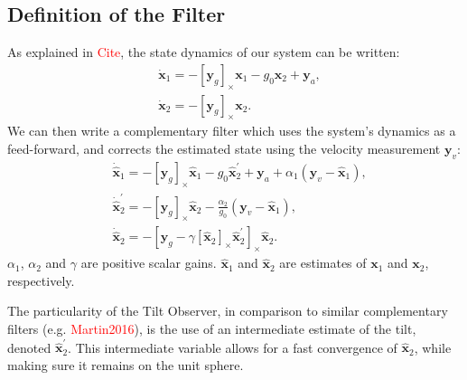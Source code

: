\documentclass{IJCAS}
\begin{document}
\subsection{Definition of the Filter}
As explained in \textcolor{red}{Cite}, the state dynamics of our system can be written:
\begin{align} 
&\dot{\boldsymbol{x}}_{1} = -\left[\boldsymbol{y}_{g}\right]_{\times} \boldsymbol{x}_{1} - g_{0}\boldsymbol{x}_{2} + \boldsymbol{y}_{a} , \label{eq:x1_dot} \\
&\dot{\boldsymbol{x}}_{2} = -\left[\boldsymbol{y}_{g}\right]_{\times} \boldsymbol{x}_{2}. \label{eq:x2_dot}
\end{align} 
We can then write a complementary filter which uses the system's dynamics as a feed-forward, and corrects the estimated state using the velocity measurement $\boldsymbol{y}_{v}$:
\begin{align} 
& \dot{\hat{\boldsymbol{x}}}_{1}  = - \left[\boldsymbol{y}_{g}\right]_{\times}\hat{\boldsymbol{x}}_{1} - g_{0} \hat{\boldsymbol{x}}_{2}^{\prime} + \boldsymbol{y}_{a} + \alpha_{1} \left(\boldsymbol{y}_{v} - \hat{\boldsymbol{x}}_{1}\right), \label{x1_dot} \\
    & \dot{\hat{\boldsymbol{x}}}_{2}^{\prime} = - \left[\boldsymbol{y}_{g}\right]_{\times} \hat{\boldsymbol{x}}_{2} - \frac{\alpha_{2}}{g_{0}} \left(\boldsymbol{y}_{v} - \hat{\boldsymbol{x}}_{1}\right), \\
    & \dot{\hat{\boldsymbol{x}}}_{2} = - \left[\boldsymbol{y}_{g} - \gamma \left[\hat{\boldsymbol{x}}_{2}\right]_{\times}\hat{\boldsymbol{x}}_{2}^{\prime}\right]_{\times} \hat{\boldsymbol{x}}_{2}.
\end{align} 
$\alpha_1$, $\alpha_2$ and $\gamma$ are positive scalar gains. $\hat{\boldsymbol{x}}_{1} $ and $\hat{\boldsymbol{x}}_{2} $ are estimates of $\boldsymbol{x}_{1} $ and $\boldsymbol{x}_{2} $, respectively. 

The particularity of the Tilt Observer, in comparison to similar complementary filters (e.g. \textcolor{red}{Martin2016}), is the use of an intermediate estimate of the tilt, denoted $\hat{\boldsymbol{x}}_{2}^{\prime}$. This intermediate variable allows for a fast convergence of $\hat{\boldsymbol{x}}_{2}$, while making sure it remains on the unit sphere. 


\end{document}
